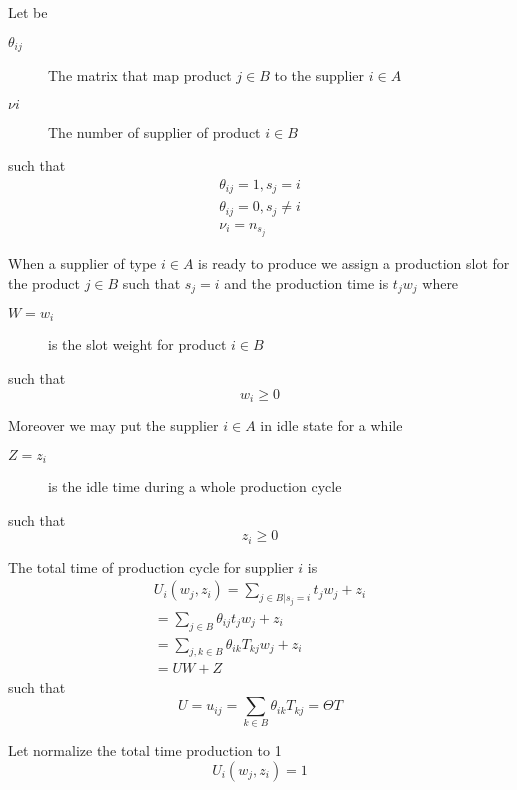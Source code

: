 \documentclass[a4paper,11pt]{article}
\begin{document}
Let be
\begin{description}
	\item [$ \theta_{ij} $]
		The matrix that map product $ j \in B $ to the supplier $ i \in A $
	\item [$ \nu i $]
	The number of supplier of product $ i \in B $
\end{description}
such that
\[
\begin{array}{l}
	\theta_{ij} = 1, s_j = i \\
	\theta_{ij} = 0, s_j \ne i \\
	\nu _i = n_{s_j}
\end{array}
\]

When a supplier of type $ i \in A $ is ready to produce we assign a production slot for the product $ j \in B $ such that $ s_j = i $ and the production time is $ t_j w_j $ where
\begin{description}
	\item[ $ W = w_i $ ] is the slot weight for product $ i \in B $
\end{description}
such that
\begin{equation}
\label{equ:YConstraints}
	w_i \ge 0
\end{equation}

Moreover we may put the supplier $ i \in A $ in idle state for a while
\begin{description}
	\item[$ Z = z_i $]
		is the idle time during a whole production cycle
\end{description}
such that
\begin{equation}
\label{equ:ZConstraints}
	z_i \ge 0
\end{equation}

The total time of production cycle for supplier $ i $ is
\[
\begin{array}{l}
	U_i(w_j, z_i) = \sum_{j \in B | s_j = i} t_j w_j + z_i \\
		= \sum_{j \in B} \theta_{ij} t_j  w_j + z_i \\
		= \sum_{j, k \in B} \theta_{ik} T_{kj} w_j + z_i \\
		= U W + Z
\end{array}
\]
such that
\[
	U = u_{ij} = \sum_{k \in B} \theta_{ik} T_{kj} = \Theta T
\]

Let normalize the total time production to 1
\begin{equation}
\label{equ:normalInterval}
	U_i(w_j, z_i) = 1
\end{equation}
\end{document}
